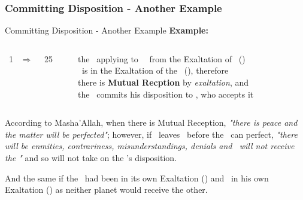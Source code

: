 \subsubsection{Committing Disposition - Another Example}
\begin{frame}[t]{Committing Disposition - Another Example}
\textbf{Example:}\footnotemark[1]
\begin{columns}[T, onlytextwidth]
\Sun\ 1 \Libra\ $\Rightarrow$ \Opposition\ \Saturn\ 25 \Aries

\rule{.1mm}{.20\textheight}

the \Sun\ applying to \Opposition\ \Saturn\ from the Exaltation of \Saturn\ (\Libra) \\
\Saturn\ is in the Exaltation of the \Sun\ (\Aries), therefore \\
there is \textbf{Mutual Recption} by \textsl{exaltation}, and \\
the \Sun\ commits his disposition to \Saturn, who accepts it
\end{columns}
\vspace{0.25cm}
According to Masha'Allah, when there is Mutual Reception, \textsl{"there is peace and the matter will be perfected"}; however, if \Saturn\ leaves \Aries\ before the \Opposition\ can perfect, \textsl{"there will be enmities, contrariness, misunderstandings, denials and \Saturn\ will not receive the \Sun"} and so will not take on the \Sun's disposition.

And the same if the \Sun\ had been in its own Exaltation (\Aries) and \Saturn\ in his own Exaltation (\Libra) as neither planet would receive the other.

\end{frame}
